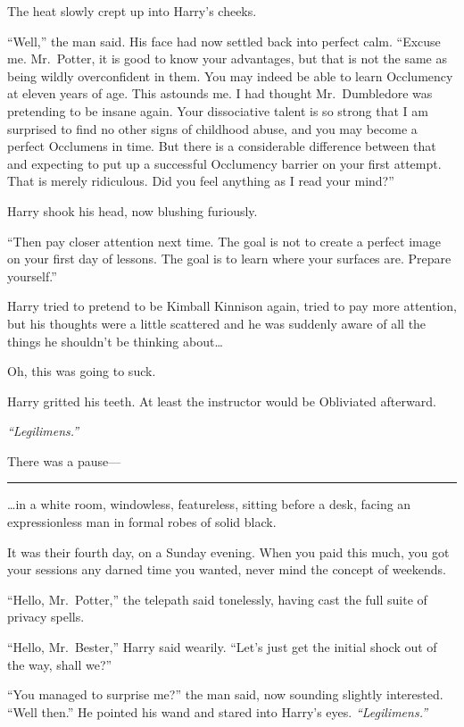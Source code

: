 The heat slowly crept up into Harry's cheeks.

``Well,'' the man said. His face had now settled back into perfect calm.
``Excuse me. Mr.~Potter, it is good to know your advantages, but that is
not the same as being wildly overconfident in them. You may indeed be
able to learn Occlumency at eleven years of age. This astounds me. I had
thought Mr.~Dumbledore was pretending to be insane again. Your
dissociative talent is so strong that I am surprised to find no other
signs of childhood abuse, and you may become a perfect Occlumens in
time. But there is a considerable difference between that and expecting
to put up a successful Occlumency barrier on your first attempt. That is
merely ridiculous. Did you feel anything as I read your mind?''

Harry shook his head, now blushing furiously.

``Then pay closer attention next time. The goal is not to create a
perfect image on your first day of lessons. The goal is to learn where
your surfaces are. Prepare yourself.''

Harry tried to pretend to be Kimball Kinnison again, tried to pay more
attention, but his thoughts were a little scattered and he was suddenly
aware of all the things he shouldn't be thinking about\ldots{}

Oh, this was going to suck.

Harry gritted his teeth. At least the instructor would be Obliviated
afterward.

\emph{``Legilimens.''}

There was a pause---

\begin{center}\rule{3in}{0.4pt}\end{center}

\ldots{}in a white room, windowless, featureless, sitting before a desk,
facing an expressionless man in formal robes of solid black.

It was their fourth day, on a Sunday evening. When you paid this much,
you got your sessions any darned time you wanted, never mind the concept
of weekends.

``Hello, Mr.~Potter,'' the telepath said tonelessly, having cast the
full suite of privacy spells.

``Hello, Mr.~Bester,'' Harry said wearily. ``Let's just get the initial
shock out of the way, shall we?''

``You managed to surprise me?'' the man said, now sounding slightly
interested. ``Well then.'' He pointed his wand and stared into Harry's
eyes. \emph{``Legilimens.''}

